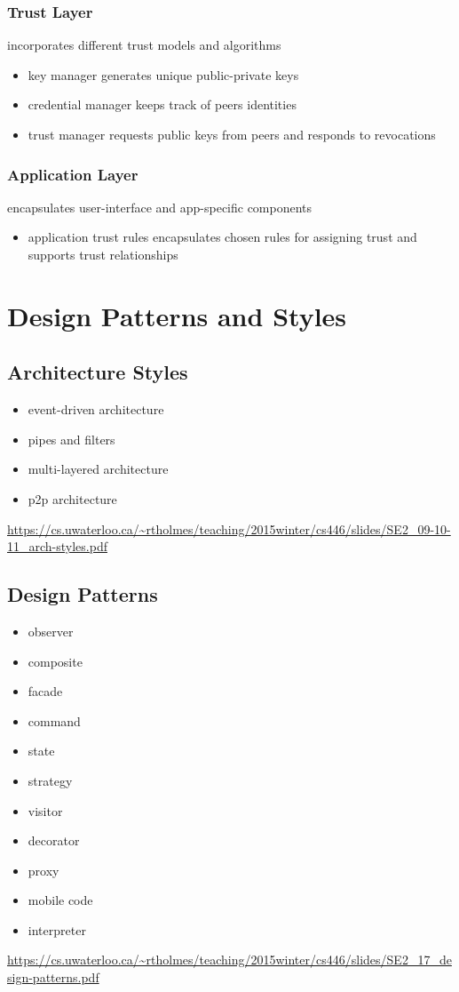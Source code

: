 \documentclass[]{article}
\theoremstyle{definition}
\begin{document}
	\subsubsection{Trust Layer}
	incorporates different trust models and algorithms
	\begin{itemize}
		\item key manager generates unique public-private keys
		\item credential manager keeps track of peers identities
		\item trust manager requests public keys from peers and responds to revocations
	\end{itemize}
	\subsubsection{Application Layer}
	encapsulates user-interface and app-specific components
	\begin{itemize}
		\item application trust rules encapsulates chosen rules for assigning trust and supports trust relationships
	\end{itemize}

	\section{Design Patterns and Styles}
	\subsection{Architecture Styles}
	\begin{itemize}
		\item event-driven architecture
		\item pipes and filters
		\item multi-layered architecture
		\item p2p architecture
	\end{itemize}
	\url{https://cs.uwaterloo.ca/~rtholmes/teaching/2015winter/cs446/slides/SE2_09-10-11_arch-styles.pdf}
	\subsection{Design Patterns}
	\begin{itemize}
		\item observer
		\item composite
		\item facade
		\item command
		\item state
		\item strategy
		\item visitor
		\item decorator
		\item proxy
		\item mobile code
		\item interpreter
	\end{itemize}
	\url{https://cs.uwaterloo.ca/~rtholmes/teaching/2015winter/cs446/slides/SE2_17_design-patterns.pdf}
\end{document}
